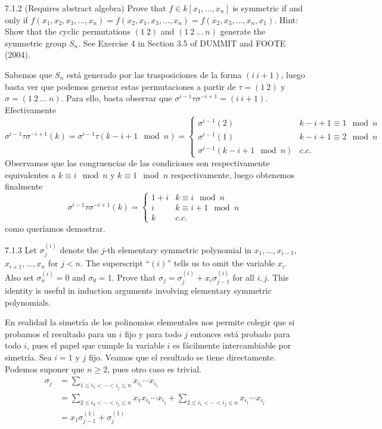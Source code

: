 \documentclass[twoside]{article}
\begin{document}
\begin{ejercicio}{7.1.2}
(Requires abstract algebra) Prove that $f ∈ k[x_1, \dots , x_n]$ is symmetric if and only if
$f (x_1, x_2, x_3, \dots , x_n) = f (x_2, x_1, x_3, \dots , x_n) = f (x_2, x_3, \dots, x_n, x_1)$. Hint: Show that the
cyclic permutations $(1\ 2)$ and $(1\ 2\ \dots \ n)$ generate the symmetric group $S_n$. See Exercise
4 in Section 3.5 of DUMMIT and FOOTE (2004).
\end{ejercicio}
\begin{solucion}
Sabemos que $S_n$ está generado por las trasposiciones de la forma $(i\ i+1)$, luego basta ver que podemos generar estas permutaciones a partir de $\tau=(1\ 2)$ y $\sigma=(1\ 2\ \dots \ n)$. Para ello, basta observar que $\sigma^{i-1}\tau\sigma^{-i+1}=(i\ i+1)$. Efectivamente
\[
\sigma^{i-1}\tau\sigma^{-i+1}(k)=\sigma^{i-1}\tau(k-i+1\mod n)=\begin{cases}
\sigma^{i-1}(2) & k-i+1\equiv 1\mod n\\
\sigma^{i-1}(1) & k-i+1\equiv 2\mod n\\
\sigma^{i-1}(k-i+1\mod n) & c.c.
\end{cases}
\]
Observamos que las congruencias de las condiciones son respectivamente equivalentes a $k\equiv i\mod n$ y $k\equiv 1\mod n$ respectivamente, luego obtenemos finalmente
\[
\sigma^{i-1}\tau\sigma^{-i+1}(k)=\begin{cases}
1+i & k\equiv i\mod n\\
i& k\equiv i+1\mod n\\
k & c.c.
\end{cases}
\]
como queríamos demostrar.
\end{solucion}

\newpage

\begin{ejercicio}{7.1.3}
Let $σ^{(i)}_j$ denote the $j$-th elementary symmetric polynomial in $x_1,\dots, x_{i−1},$ $x_{i+1},\dots, x_n$
for $j < n$. The superscript “$(i)$” tells us to omit the variable $x_i$. Also set $σ^{(i)}_n = 0$ and
$σ_0 = 1$. Prove that $σ_j = σ^{(i)}_j + x_iσ^{(i)}_{j−1}$ for all $i, j$. This identity is useful in induction
arguments involving elementary symmetric polynomials.
\end{ejercicio}
\begin{solucion}
En realidad la simetría de los polinomios elementales nos permite colegir que si probamos el resultado para un $i$ fijo y para todo $j$ entonces está probado para todo $i$, pues el papel que cumple la variable $i$ es fácilmente intercambiable por simetría. Sea $i=1$ y $j$ fijo. Veamos que el resultado se tiene directamente. Podemos suponer que $n\geq 2$, pues otro caso es trivial.
\begin{align*}
\sigma_j &= \sum_{1\leq i_1<\cdots<i_j\leq n}x_{i_1}\cdots x_{i_j}\\
&= \sum_{2\leq i_2<\cdots <i_j\leq n}x_{1}x_{i_2}\cdots x_{i_j} + \sum_{2\leq i_1<\cdots<i_j\leq n}x_{i_1}\cdots x_{i_j} \\
& = x_1 \sigma_{j-1}^{(1)}+\sigma_j^{(1)}
\end{align*}
\end{solucion}
\newpage
\end{document}
